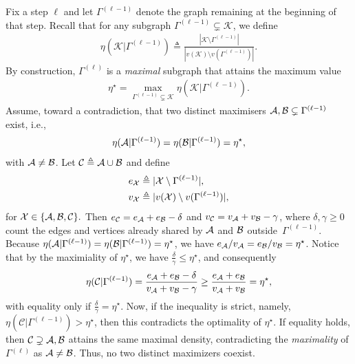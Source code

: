 \documentclass[12pt]{article}
\newcommand{\calA}{{\cal A}}
\newcommand{\calB}{{\cal B}}
\newcommand{\calC}{{\cal C}}
\newcommand{\calX}{{\cal X}}
\begin{document}
Fix a step $\ell$ and let $\Gamma^{(\ell-1)}$ denote the graph remaining at the beginning of that step. Recall that for any subgraph $\Gamma^{(\ell-1)}\subsetneq\mathcal{K}$, we define
\begin{align}
  \eta(\mathcal{K}\vert\Gamma^{(\ell-1)})
  \triangleq\frac{|\mathcal{K}\setminus\Gamma^{(\ell-1)}|}
        {|v(\mathcal{K})\setminus v(\Gamma^{(\ell-1)})|}.
\end{align}
By construction, $\Gamma^{(\ell)}$ is a \emph{maximal} subgraph that attains the
maximum value
\begin{align}
  \eta^\star=
  \max_{\Gamma^{(\ell-1)}\subsetneq\mathcal{K}}
       \eta(\mathcal{K}\vert\Gamma^{(\ell-1)}).
\end{align}
Assume, toward a contradiction, that two distinct maximisers $\calA,\calB\subsetneq\Gamma^{(\ell-1)}$ exist, i.e.,
\begin{align}
  \eta(\calA\vert\Gamma^{(\ell-1)})
  =\eta(\calB\vert\Gamma^{(\ell-1)})
  =\eta^\star,
\end{align}
with $\calA\neq\calB$. Let $\mathcal{C}\triangleq\calA\cup\calB$ and define
\begin{align}
  e_{\calX}&\triangleq|\mathcal{X}\setminus\Gamma^{(\ell-1)}|,\\
  v_{\calX}&\triangleq|v(\mathcal{X})\setminus v(\Gamma^{(\ell-1)})|,
\end{align}
for $\calX\in\{\calA,\calB,\calC\}.$ Then $e_{\calC}=e_{\calA}+e_{\calB}-\delta$ and $v_{\calC}=v_{\calA}+v_{\calB}-\gamma$, where $\delta,\gamma\geq  0$ count the edges and vertices already shared by $\calA$ and $\calB$ outside~$\Gamma^{(\ell-1)}$. Because $\eta(\calA\vert\Gamma^{(\ell-1)})=\eta(\calB\vert\Gamma^{(\ell-1)})=\eta^\star$, we have
$e_{\calA}/v_{\calA} = e_{\calB}/v_{\calB} = \eta^\star$. Notice that by the maximiality of $\eta^\star$, we have $\frac{\delta}{\gamma}\leq\eta^\star$, and consequently
\begin{align}
  \eta(\mathcal{C}\vert\Gamma^{(\ell-1)})
  =\frac{e_{\calA}+e_{\calB}-\delta}{v_{\calA}+v_{\calB}-\gamma}
  \ge
  \frac{e_{\calA}+e_{\calB}}{v_{\calA}+v_{\calB}}
  = \eta^\star,
\end{align}
with equality only if $\frac{\delta}{\gamma}=\eta^\star$. Now, if the inequality is strict, namely, $\eta(\mathcal{C}\vert\Gamma^{(\ell-1)})>\eta^\star$, then this contradicts the optimality of $\eta^\star$. If equality holds, then $\mathcal{C}\supsetneq\calA,\calB$ attains the same maximal density, contradicting the \emph{maximality} of $\Gamma{^(\ell)}$ as $\calA\neq\calB$. Thus, no two distinct maximizers coexist.
\end{document}
